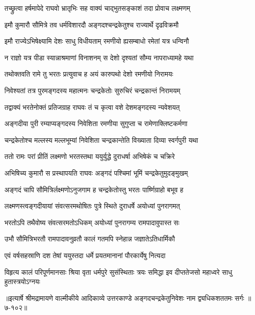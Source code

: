 
\twolineshloka
{तच्छ्रुत्वा हर्षमापेदे राघवो भ्रातृभिः सह}
{वाक्यं चाद्भुतसङ्काशं तदा प्रोवाच लक्ष्मणम्} %

\twolineshloka
{इमौ कुमारौ सौमित्रे तव धर्मविशारदौ}
{अङ्गदश्चन्द्रकेतुश्च राज्यार्थे दृढविक्रमौ} %

\twolineshloka
{इमौ राज्येऽभिषेक्ष्यामि देशः साधु विधीयताम्}
{रमणीयो ह्यसम्बाधो रमेतां यत्र धन्विनौ} %

\twolineshloka
{न राज्ञो यत्र पीडा स्यान्नाश्रमाणां विनाशनम्}
{स देशो दृश्यतां सौम्य नापराध्यामहे यथा} %

\twolineshloka
{तथोक्तवति रामे तु भरतः प्रत्युवाच ह}
{अयं कारुपथो देशो रमणीयो निरामयः} %

\twolineshloka
{निवेश्यतां तत्र पुरमङ्गदस्य महात्मनः}
{चन्द्रकेतोः सुरुचिरं चन्द्रकान्तं निरामयम्} %

\twolineshloka
{तद्वाक्यं भरतेनोक्तं प्रतिजग्राह राघवः}
{तं च कृत्वा वशे देशमङ्गदस्य न्यवेशयत्} %

\twolineshloka
{अङ्गदीया पुरी रम्याप्यङ्गदस्य निवेशिता}
{रमणीया सुगुप्ता च रामेणाक्लिष्टकर्मणा} %

\twolineshloka
{चन्द्रकेतोश्च मल्लस्य मल्लभूम्यां निवेशिता}
{चन्द्रकान्तेति विख्याता दिव्या स्वर्गपुरी यथा} %

\twolineshloka
{ततो रामः परां प्रीतिं लक्ष्मणो भरतस्तथा}
{ययुर्युद्धे दुराधर्षा अभिषेकं च चक्रिरे} %

\twolineshloka
{अभिषिच्य कुमारौ स प्रस्थापयति राघवः}
{अङ्गदं पश्चिमां भूमिं चन्द्रकेतुमुदङ्मुखम्} %

\twolineshloka
{अङ्गदं चापि सौमित्रिर्लक्ष्मणोऽनुजगाम ह}
{चन्द्रकेतोस्तु भरतः पार्ष्णिग्राहो बभूव ह} %

\twolineshloka
{लक्ष्मणस्त्वङ्गदीयायां संवत्सरमथोषितः}
{पुत्रे स्थिते दुराधर्षे अयोध्यां पुनरागमत्} %

\twolineshloka
{भरतोऽपि तथैवोष्य संवत्सरमतोऽधिकम्}
{अयोध्यां पुनरागम्य रामपादावुपास्त सः} %

\twolineshloka
{उभौ सौमित्रिभरतौ रामपादावनुव्रतौ}
{कालं गतमपि स्नेहान्न जज्ञातेऽतिधार्मिकौ} %

\twolineshloka
{एवं वर्षसहस्राणि दश तेषां ययुस्तदा}
{धर्मे प्रयतमानानां पौरकार्येषु नित्यदा} %

\twolineshloka
{विहृत्य कालं परिपूर्णमानसाः श्रिया वृता धर्मपुरे सुसंस्थिताः}
{त्रयः समिद्धा इव दीप्ततेजसो महाध्वरे साधु हुतास्त्रयोऽग्नयः} %


॥इत्यार्षे श्रीमद्रामायणे वाल्मीकीये आदिकाव्ये उत्तरकाण्डे अङ्गदचन्द्रकेतुनिवेशः नाम द्व्यधिकशततमः सर्गः ॥७-१०२॥
